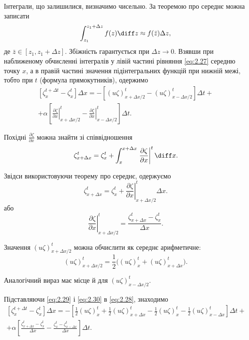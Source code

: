 Інтеграли, що залишилися, визначимо чисельно. За теоремою про середнє можна записати
\begin{equation*}
    \int_{z_1}^{z_1 + \Delta z} f(z) \diff z \approx f(\bar z) \Delta z,
\end{equation*}
де $\bar z \in [z_1, z_1 + \Delta z]$. Збіжність гарантується при $\Delta z \to 0$. Взявши при наближеному обчисленні інтегралів у лівій частині рівняння \eqref{eq:2.27} середню точку $x$, а в правій частині значення підінтегральних функцій при нижній межі, тобто при $t$ (формула прямокутників), одержимо
\begin{multline}
    \label{eq:2.28}
    \left[ \zeta_x^{t + \Delta t} - \zeta_x^t \right] \Delta x = - \left[ (u \zeta)_{x + \Delta x / 2}^t - (u \zeta)_{x - \Delta x / 2}^t\right] \Delta t + \\ + \alpha \left[ \left. \frac{\partial \zeta}{\partial x} \right|_{x + \Delta x / 2}^t - \left. \frac{\partial \zeta}{\partial x} \right|_{x - \Delta x / 2}^t \right] \Delta t.
\end{multline}

Похідні $\frac{\partial \zeta}{\partial x}$ можна знайти зі співвідношення
\begin{equation*}
    \zeta_{x + \Delta x}^t = \zeta_x^t + \int_x^{x + \Delta x} \left. \frac{\partial \zeta}{\partial x} \right|^t \diff x.
\end{equation*}

Звідси використовуючи теорему про середнє, одержуємо
\begin{equation*}
    \zeta_{x + \Delta x}^t = \zeta_x^t + \left. \frac{\partial \zeta}{\partial x} \right|_{x + \Delta x/2}^t \Delta x.
\end{equation*}
або
\begin{equation}
    \label{eq:2.29}
    \left. \frac{\partial \zeta}{\partial x} \right|_{x + \Delta x/2}^t = \frac{\zeta_{x + \Delta x}^t - \zeta_x^t}{\Delta x}.
\end{equation}

Значення $(u \zeta)_{x + \Delta x / 2}^t$ можна обчислити як середнє арифметичне:
\begin{equation}
    \label{eq:2.30}
    (u \zeta)_{x + \Delta x / 2}^t = \frac{1}{2} \Big( (u \zeta)_x^t + (u \zeta)_{x + \Delta x}^t \Big).
\end{equation}

Аналогічний вираз має місце й для $(u \zeta)_{x - \Delta x / 2}^t$. \medskip

Підставляючи \eqref{eq:2.29} і \eqref{eq:2.30} в \eqref{eq:2.28}, знаходимо
\begin{multline*}
    \left[ \zeta_x^{t + \Delta t} - \zeta_x^t \right] \Delta x = - \left[ \frac{1}{2} (u \zeta)_x^t + \frac{1}{2} (u \zeta)_{x + \Delta x}^t - \frac{1}{2} (u \zeta)_x^t - \frac{1}{2} (u \zeta)_{x - \Delta x}^t \right] \Delta t + \\ + \alpha \left[ \frac{\zeta_{x + \Delta x}^t - \zeta_x^t}{\Delta x} - \frac{\zeta_x^t - \zeta_{x - \Delta x}^t}{\Delta x} \right] \Delta t.
\end{multline*}

